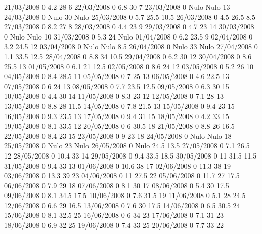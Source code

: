 21/03/2008  0      4.2    28     6 
22/03/2008  0      6.8    30     7 
23/03/2008  0     Nulo   Nulo    13 
24/03/2008  0     Nulo    30    Nulo
25/03/2008  0      5.7    25.5   10.5 
26/03/2008  0      4.5    26.5   8.5 
27/03/2008  0      8.2    27     8 
28/03/2008  0      4.4    23     9 
29/03/2008  0      4.7    23     14 
30/03/2008  0     Nulo   Nulo    10 
31/03/2008  0      5.3    24    Nulo
01/04/2008  0      6.2    23.5   9 
02/04/2008  0      3.2    24.5   12 
03/04/2008  0     Nulo   Nulo    8.5 
26/04/2008  0     Nulo    33    Nulo
27/04/2008  0      1.1    33.5   12.5 
28/04/2008  0      8.8    34     10.5 
29/04/2008  0      6.2    30     12 
30/04/2008  0      8.6    25.5   13 
01/05/2008  0      6.1    21     12.5 
02/05/2008  0      8.6    24     12 
03/05/2008  0      5.2    26     10 
04/05/2008  0      8.4    28.5   11 
05/05/2008  0      7      25     13 
06/05/2008  0      4.6    22.5   13 
07/05/2008  0      6      24     13 
08/05/2008  0      7.7    23.5   12.5 
09/05/2008  0      6.3    30     15 
10/05/2008  0      4.4    30     14 
11/05/2008  0      8.3    23     12 
12/05/2008  0      7.1    28     13 
13/05/2008  0      8.8    28     11.5 
14/05/2008  0      7.8    21.5   13 
15/05/2008  0      9.4    23     15 
16/05/2008  0      9.3    23.5   13 
17/05/2008  0      9.4    31     15 
18/05/2008  0      4.2    33     15 
19/05/2008  0      8.1    33.5   12 
20/05/2008  0      6      30.5   18 
21/05/2008  0      8.8    26     16.5 
22/05/2008  0      8.4    23     15 
23/05/2008  0      9      23     18 
24/05/2008  0     Nulo   Nulo    18 
25/05/2008  0     Nulo    23    Nulo
26/05/2008  0     Nulo    24.5   13.5 
27/05/2008  0      7.1    26.5   12 
28/05/2008  0      10.4   33     14 
29/05/2008  0      9.4    33.5   18.5 
30/05/2008  0      11     31.5   11.5 
31/05/2008  0      9.4    33     13 
01/06/2008  0      10.6   38     17 
02/06/2008  0      11.3   38     19 
03/06/2008  0      13.3   39     23 
04/06/2008  0      11     27.5   22 
05/06/2008  0      11.7   27     17.5 
06/06/2008  0      7.9    29     18 
07/06/2008  0      8.1    30     17 
08/06/2008  0      5.4    30     17.5 
09/06/2008  0      8.1    34.5   17.5 
10/06/2008  0      7.6    31.5   19 
11/06/2008  0      5.1    28     24.5 
12/06/2008  0      6.6    29     16.5 
13/06/2008  0      7.6    30     17.5 
14/06/2008  0      6.5    30.5   24 
15/06/2008  0      8.1    32.5   25 
16/06/2008  0      6      34     23 
17/06/2008  0      7.1    31     23 
18/06/2008  0      6.9    32     25 
19/06/2008  0      7.4    33     25 
20/06/2008  0      7.7    33     22 
